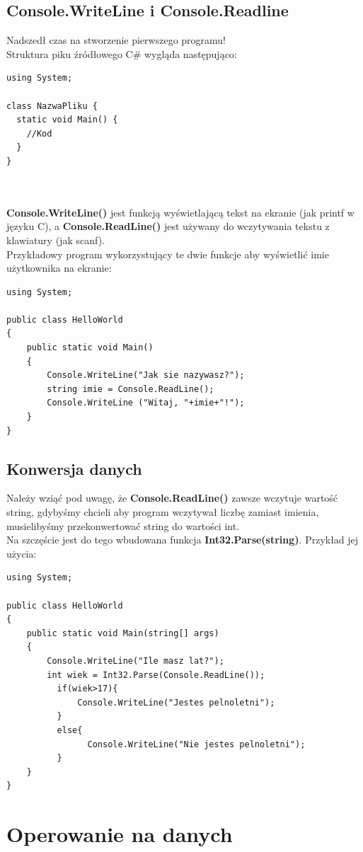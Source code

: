 \documentclass[a4paper]{article}
\theoremstyle{definition}
\begin{document}
\subsection{Console.WriteLine i Console.Readline}
Nadszedł czas na stworzenie pierwszego programu!
\\Struktura piku źródłowego C\# wygląda następująco:
\lstset{language=C}
\begin{lstlisting}[frame=single]
using System;

class NazwaPliku {
  static void Main() {
    //Kod
  }
}
\end{lstlisting}
\\	\\\textbf{Console.WriteLine()} jest funkcją wyświetlającą tekst na ekranie (jak printf w języku C), a \textbf{Console.ReadLine()} jest używany do wczytywania tekstu z klawiatury (jak scanf).
\\Przykładowy program wykorzystujący te dwie funkcje aby wyświetlić imie użytkownika na ekranie:
\lstset{language=C}
\begin{lstlisting}[frame=single]
using System;

public class HelloWorld
{
    public static void Main()
    {
        Console.WriteLine("Jak sie nazywasz?");
        string imie = Console.ReadLine();
        Console.WriteLine ("Witaj, "+imie+"!");
    }
}
\end{lstlisting}
\subsection{Konwersja danych}
Należy wziąć pod uwagę, że \textbf{Console.ReadLine()} zawsze wczytuje wartość string, gdybyśmy chcieli aby program wczytywał liczbę zamiast imienia, musielibyśmy przekonwertować string do wartości int.\\
Na szczęście jest do tego wbudowana funkcja \textbf{Int32.Parse(string)}. Przykład jej użycia:\\
\begin{lstlisting}[frame=single]
using System;

public class HelloWorld
{
    public static void Main(string[] args)
    {
        Console.WriteLine("Ile masz lat?");
        int wiek = Int32.Parse(Console.ReadLine());
	      if(wiek>17){
        	  Console.WriteLine("Jestes pelnoletni");
	      }
	      else{
		        Console.WriteLine("Nie jestes pelnoletni");
	      }
    }
}
\end{lstlisting}
\section{Operowanie na danych}
\end{document}
